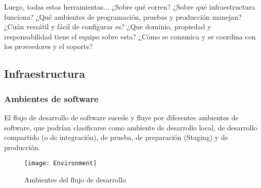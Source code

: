 Luego, todas estas herramientas... ¿Sobre qué corren? ¿Sobre qué infraestructura funciona? ¿Qué ambientes de programación, pruebas y producción manejan? ¿Cuán versátil y fácil de configurar es? ¿Que dominio, propiedad y responsabilidad tiene el equipo sobre esta? ¿Cómo se comunica y se coordina con los proveedores y el soporte?


\subsection{Infraestructura}


\subsubsection{Ambientes de software}
El flujo de desarrollo de software sucede y fluye por diferentes ambientes de software, que podrían clasificarse como ambiente de desarrollo local, de desarrollo compartido (o de integración), de prueba, de preparación (Staging) y de producción.

\begin{figure}[h]
  \centering
  \texttt{[image: Environment]}
  \caption{Ambientes del flujo de desarrollo}
  \centering
  \label{fig:Environment} %
\end{figure}
\FloatBarrier %

